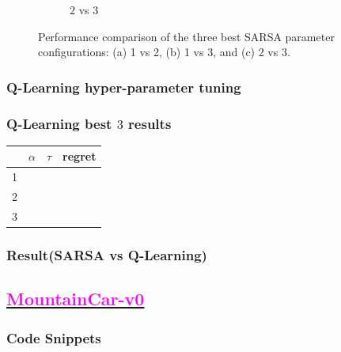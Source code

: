\documentclass[11pt, a4]{article}
\begin{document}
\begin{figure}[H]
\begin{subfigure}[h]{0.7\textwidth}
						\caption{$2$ vs $3$}
						\label{fig:sarsacartpole2vs3}
					\end{subfigure}
					\caption{Performance comparison of the three best SARSA parameter configurations: (a) 1 vs 2, (b) 1 vs 3, and (c) 2 vs 3.}
					\label{fig:sarsacartpole}
				\end{figure}
			\subsubsection{Q-Learning hyper-parameter tuning}
			\subsubsection{Q-Learning best $3$ results}
				\begin{center}
					\begin{tabular}{|c|c|c|c|}
						\hline
						& $\alpha$ & $\tau$ & regret\\
						\hline
						1 &  & &\\
						\hline
						2 & & &\\
						\hline
						3 & & &\\
						\hline
					\end{tabular}
					
				\end{center}
			\subsubsection{Result(SARSA vs Q-Learning)}
		\subsection{\href{https://github.com/RitabrataMandal/RL-DA6400-assignment_1/tree/main/mountain_car-v0}{\textcolor{magenta}{MountainCar-v0}}}
			\subsubsection{Code Snippets}
				
				
				
				
				
\end{document}

